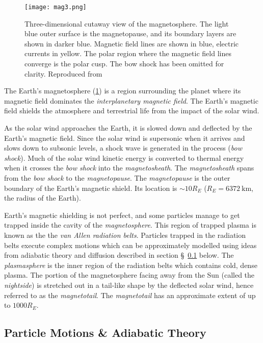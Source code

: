 \begin{figure}[ht]
    \noindent\texttt{[image: mag3.png]}
    \caption{
        {\small 
            Three-dimensional cutaway view of the magnetosphere. The light blue outer surface is 
            the magnetopause, and its boundary layers are shown in darker blue. Magnetic field lines 
            are shown in blue, electric currents in yellow. The polar region where the magnetic 
            field lines converge is the polar cusp. The bow shock has been omitted for clarity. 
            Reproduced from \citet{DeKeyser2005}
        }
    }
    \label{fig:magnetosphere}
\end{figure}

The Earth's magnetosphere (\cref{fig:magnetosphere}) is a region surrounding the planet where its 
magnetic field dominates the \emph{interplanetary magnetic field}. The Earth's magnetic field 
shields the atmosphere and terrestrial life from the impact of the solar wind. 

As the solar wind approaches the Earth, it is slowed down and deflected by the Earth's magnetic 
field. Since the solar wind is supersonic when it arrives and slows down to subsonic levels, a 
shock wave is generated in the process (\emph{bow shock}). Much of the solar wind kinetic energy is 
converted to thermal energy when it crosses the \emph{bow shock} into the \emph{magnetosheath}. The 
\emph{magnetosheath} spans from the \emph{bow shock} to the \emph{magnetopause}. The 
\emph{magnetopause} is the outer boundary of the Earth's magnetic shield. Its location is 
$\sim 10R_E$ ($R_E = \SI{6372}{\kilo\metre}$, the radius of the Earth). 


Earth's magnetic shielding is not perfect, and some particles manage to get trapped inside the 
cavity of the \emph{magnetosphere}. This region of trapped plasma is known as the the 
\emph{van Allen radiation belts}. Particles trapped in the radiation belts execute complex motions 
which can be approximately modelled using ideas from adiabatic theory and diffusion described in 
section \S~\ref{sec:plasmadiff} below. The \emph{plasmasphere} is the inner region of the radiation 
belts which contains cold, dense plasma. The portion of the magnetosphere facing away from the Sun 
(called the \emph{nightside}) is stretched out in a tail-like shape by the deflected solar wind, 
hence referred to as the \emph{magnetotail}. The \emph{magnetotail} has an approximate extent 
of up to $1000R_E$.


\subsection{Particle Motions \& Adiabatic Theory} \label{sec:plasmadiff}

